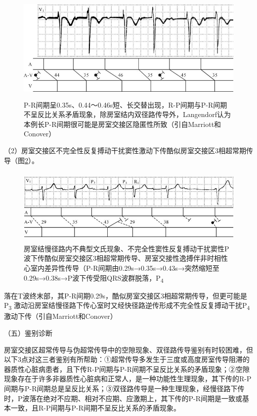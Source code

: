 \begin{figure}[!htbp]
 \centering
 \includegraphics[width=5.01042in,height=2.09375in]{./images/Image00479.jpg}
 \captionsetup{justification=centering}
 \caption{P-R间期呈0.35s、0.44～0.46s短、长交替出现，R-P间期与P-R间期不呈反比关系矛盾现象，除房室结内双径路传导外，Langendorf认为本例长P-R间期很可能是房室交接区隐匿性所致（引自Marriott和Conover）}
 \label{fig28-18}
  \end{figure} 

（2）房室交接区不完全性反复搏动干扰窦性激动下传酷似房室交接区3相超常期传导（图\ref{fig28-19}）。

\begin{figure}[!htbp]
 \centering
 \includegraphics[width=5.125in,height=1.45833in]{./images/Image00480.jpg}
 \captionsetup{justification=centering}
 \caption{房室结慢径路内不典型文氏现象、不完全性窦性反复搏动干扰窦性P波下传酷似房室交接区3相超常期传导、房室交接性逸搏伴非时相性心室内差异性传导（P-R间期由0.29s→0.35s→0.43s→突然缩短至0.29s→0.38s→P波下传受阻QRS波群脱落，P\textsubscript{4}}
 \label{fig28-19}
  \end{figure} 
落在T波终末部，其P-R间期0.29s，酷似房室交接区3相超常期传导，但更可能是P\textsubscript{3}
激动沿房室结慢径路下传心室时又经快径路逆传形成不完全性反复搏动干扰P\textsubscript{4}
激动下传（引自Marriott和Conover）

（五）鉴别诊断

房室交接区超常传导与伪超常传导中的空隙现象、双径路传导鉴别有时较困难，但以下3点对这三者鉴别有所帮助：①超常传导多发生于三度或高度房室传导阻滞的器质性心脏病患者，且下传R-P间期与P-R间期不呈反比关系的矛盾现象；②空隙现象存在于许多非器质性心脏病和正常人，是一种功能性生理现象，其下传的R-P间期与P-R间期总是呈反比关系；③双径路传导是一种生理现象，经慢径路下传时，P波落在绝对不应期、相对不应期、应激期上，其下传的P-R间期是一致或基本一致，且R-P间期与P-R间期不呈反比关系的矛盾现象。


